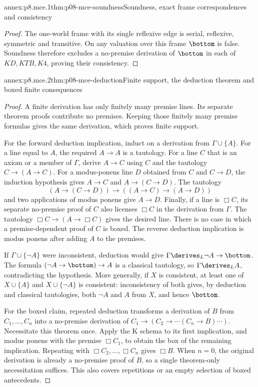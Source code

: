 \begin{annexitem}{annex:p8.mce.1}{thm:p08-mce-soundness}{Soundness, exact frame correspondences and consistency}
\begin{proof}
The one-world frame with its single reflexive edge is serial, reflexive,
symmetric and transitive. On any valuation over this frame \(\bottom\)
is false. Soundness therefore excludes a no-premise derivation of
\(\bottom\) in each of \(KD,KTB,K4\), proving their consistency.
\end{proof}
\end{annexitem}

\begin{annexitem}{annex:p8.mce.2}{thm:p08-mce-deduction}{Finite support, the deduction theorem and boxed finite consequences}
\begin{proof}
A finite derivation has only finitely many premise lines. Its separate
theorem proofs contribute no premises. Keeping those finitely many premise
formulas gives the same derivation, which proves finite support.

For the forward deduction implication, induct on a derivation from
\(\Gamma\cup\{A\}\). For a line equal to \(A\), the required
\(A\to A\) is a tautology. For a line \(C\) that is an axiom or
a member of \(\Gamma\), derive \(A\to C\) using \(C\) and the
tautology \(C\to(A\to C)\). For a modus-ponens line \(D\)
obtained from \(C\) and \(C\to D\), the induction hypothesis gives
\(A\to C\) and \(A\to(C\to D)\). The tautology
\[
 (A\to(C\to D))\to((A\to C)\to(A\to D))
\]
and two applications of modus ponens give \(A\to D\). Finally, if a
line is \(\Box C\), its separate no-premise proof of \(C\) also
licenses \(\Box C\) in the derivation from \(\Gamma\). The
tautology \(\Box C\to(A\to\Box C)\) gives the desired line.
There is no case in which a premise-dependent proof of \(C\) is boxed.
The reverse deduction implication is modus ponens after adding \(A\)
to the premises.

If \(\Gamma\cup\{\neg A\}\) were inconsistent, deduction would
give \(\Gamma\derives_L\neg A\to\bottom\). The formula
\((\neg A\to\bottom)\to A\) is a classical tautology, so
\(\Gamma\derives_L A\), contradicting the hypothesis. More generally,
if \(X\) is consistent, at least one of \(X\cup\{A\}\) and
\(X\cup\{\neg A\}\) is consistent: inconsistency of both gives,
by deduction and classical tautologies, both \(\neg A\) and \(A\)
from \(X\), and hence \(\bottom\).

For the boxed claim, repeated deduction transforms a derivation of \(B\)
from \(C_1,\ldots,C_n\) into a no-premise derivation of
\(C_1\to(C_2\to\cdots(C_n\to B)\cdots)\). Necessitate this
theorem once. Apply the K schema to its first implication, and modus
ponens with the premise \(\Box C_1\), to obtain the box of the
remaining implication. Repeating with \(\Box C_2,\ldots,\Box C_n\)
gives \(\Box B\). When \(n=0\), the original derivation is already
a no-premise proof of \(B\), so a single theorem-only necessitation
suffices. This also covers repetitions or an empty selection of boxed
antecedents.
\end{proof}
\end{annexitem}

